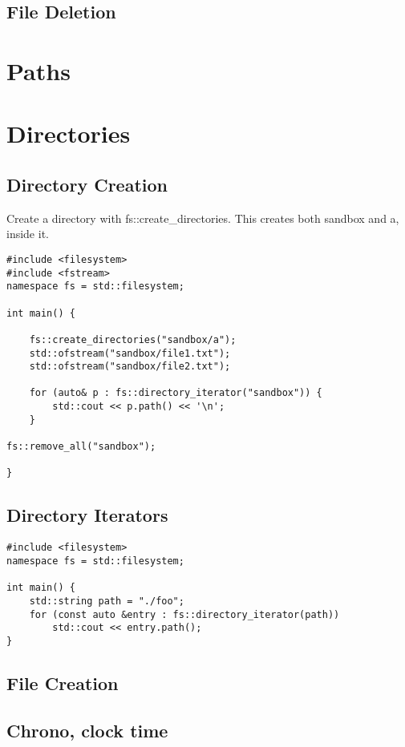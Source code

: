 \documentclass[openany]{report}
\begin{document}
\subsection{File Deletion}

\section{Paths}

\section{Directories}

\subsection{Directory Creation}

Create a directory with fs::create\_directories. This creates both sandbox and a, inside it.

\begin{verbatim}
#include <filesystem>
#include <fstream>
namespace fs = std::filesystem;

int main() {

    fs::create_directories("sandbox/a");
    std::ofstream("sandbox/file1.txt");
    std::ofstream("sandbox/file2.txt");

    for (auto& p : fs::directory_iterator("sandbox")) {
        std::cout << p.path() << '\n';
    } 

fs::remove_all("sandbox");

}
\end{verbatim}

\subsection{Directory Iterators}

\begin{verbatim}
#include <filesystem>
namespace fs = std::filesystem;

int main() {
    std::string path = "./foo";
    for (const auto &entry : fs::directory_iterator(path))
        std::cout << entry.path();
}
\end{verbatim}

\subsection{File Creation}

\subsection{Chrono, clock time}
\end{document}
